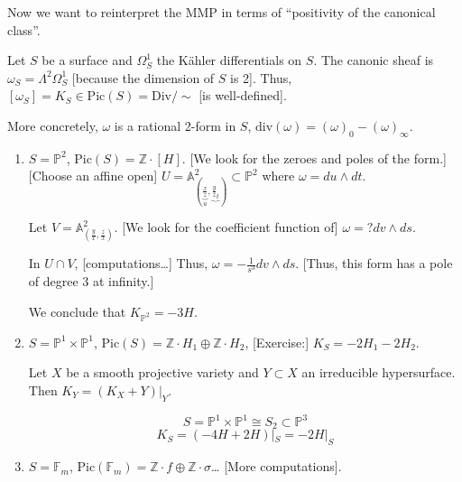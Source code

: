 \noindent
Now we want to reinterpret the MMP
in terms of ``positivity of the canonical
class''.

\begin{definition}
\label{definition-canonical-class}
Let $S$ be a surface and $\Omega^1_S$
the Kähler differentials on $S$.
The canonic sheaf is
$\omega_S=\Lambda^2\Omega_S^1$
[because the dimension of $S$ is 2].
Thus, $[\omega_S]=K_S \in
\text{Pic}(S)=\text{Div}/\sim$
[is well-defined].
\end{definition}

\noindent
More concretely,
$\omega$ is a rational 2-form in $S$,
$\text{div}(\omega)=(\omega)_0-(\omega)
_\infty$.

\begin{example}
\label{example-canonical-class-of-p2}
\begin{enumerate}
\item $S=\mathbb{P}^2$,
$\text{Pic}(S)=\mathbb{Z}\cdot[H]$.
[We look for the zeroes and poles of the
form.]
[Choose an affine open]
$U=\mathbb{A}^2_{\left(
\underbrace{\frac{x}{z}}_{u},
\underbrace{\frac{y}{z}_{t}}\right) }\subset
\mathbb{P}^2$
where $\omega=du \wedge dt$.

Let $V=\mathbb{A}^2_{\left(
\frac{y}{x},\frac{z}{x}\right)}$.
[We look for the coefficient function of]
$\omega= ? dv \wedge ds$.

In $U \cap V$, [computations…]
Thus, $\omega=-\frac{1}{s^3}dv \wedge ds$.
[Thus, this form has a pole of degree 3 at
infinity.]

We conclude that $K_{\mathbb{P}^2}=-3H$.

\item $S=\mathbb{P}^1 \times \mathbb{P}^1$,
$\text{Pic}(S)=\mathbb{Z}\cdot H_1 \oplus
\mathbb{Z}\cdot H_2$,
[Exercise:] $K_S=-2H_1 - 2H_2$.
\begin{lemma}
\label{lemma-adjunction}
Let $X$ be a smooth projective variety
and $Y \subset X$ an irreducible
hypersurface.
Then $K_Y=(K_X+Y)|_Y$.
\end{lemma}

\noindent
[Then]
$$
S=\mathbb{P}^1 \times \mathbb{P}^1 \cong S_2
\subset \mathbb{P}^3
$$
$$
K_S = (-4H+2H)|_S=-2H|_S
$$

\item $S= \mathbb{F}_m$,
$\text{Pic}(\mathbb{F}_m)=\mathbb{Z}\cdot f
\oplus \mathbb{Z}\cdot\sigma$… [More
computations].
\end{enumerate}
\end{example}

